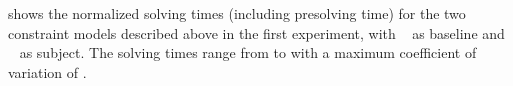  shows the
normalized solving times (including presolving time) for the two
\glspl{constraint model} described above in the first experiment, with
~\modelA{} as \gls{baseline} and ~\modelB{} as \gls{subject}.
%
The solving times range from
\printMinSolvingTime{
  \SolvTechDisableDomMatchesPrePlusSolvingTimeSpeedupAllPrePlusSolvingTimeAvgMin,
  \SolvTechDisableDomMatchesPrePlusSolvingTimeSpeedupPrePlusSolvingTimeAvgMin,
  \SolvTechDisableIllegalMatchesUncoveredOpsPrePlusSolvingTimeSpeedupPrePlusSolvingTimeAvgMin,
  \SolvTechDisableIllegalMatchesUndefinedDataPrePlusSolvingTimeSpeedupPrePlusSolvingTimeAvgMin,
  \SolvTechDisableIllegalMatchesKillsPrePlusSolvingTimeSpeedupPrePlusSolvingTimeAvgMin,
  \SolvTechDisableIllegalMatchesDefLocsPrePlusSolvingTimeSpeedupPrePlusSolvingTimeAvgMin,
  \SolvTechDisableIllegalMatchesUseLocsPrePlusSolvingTimeSpeedupPrePlusSolvingTimeAvgMin,
  \SolvTechDisableRedunKillsPrePlusSolvingTimeSpeedupPrePlusSolvingTimeAvgMin,
  \SolvTechDisableRedunNonNullCopyMatchesPrePlusSolvingTimeSpeedupPrePlusSolvingTimeAvgMin,
  \SolvTechDisableCanonicalLocsPrePlusSolvingTimeSpeedupPrePlusSolvingTimeAvgMin
} to
\printMaxSolvingTime{
  \SolvTechDisableDomMatchesPrePlusSolvingTimeSpeedupAllPrePlusSolvingTimeAvgMax,
  \SolvTechDisableDomMatchesPrePlusSolvingTimeSpeedupPrePlusSolvingTimeAvgMax,
  \SolvTechDisableIllegalMatchesUncoveredOpsPrePlusSolvingTimeSpeedupPrePlusSolvingTimeAvgMax,
  \SolvTechDisableIllegalMatchesUndefinedDataPrePlusSolvingTimeSpeedupPrePlusSolvingTimeAvgMax,
  \SolvTechDisableIllegalMatchesKillsPrePlusSolvingTimeSpeedupPrePlusSolvingTimeAvgMax,
  \SolvTechDisableIllegalMatchesDefLocsPrePlusSolvingTimeSpeedupPrePlusSolvingTimeAvgMax,
  \SolvTechDisableIllegalMatchesUseLocsPrePlusSolvingTimeSpeedupPrePlusSolvingTimeAvgMax,
  \SolvTechDisableRedunKillsPrePlusSolvingTimeSpeedupPrePlusSolvingTimeAvgMax,
  \SolvTechDisableRedunNonNullCopyMatchesPrePlusSolvingTimeSpeedupPrePlusSolvingTimeAvgMax,
  \SolvTechDisableCanonicalLocsPrePlusSolvingTimeSpeedupPrePlusSolvingTimeAvgMax
} with a maximum coefficient of variation of
\numMaxOf{
  \SolvTechDisableDomMatchesPrePlusSolvingTimeSpeedupAllPrePlusSolvingTimeCvMax,
  \SolvTechDisableDomMatchesPrePlusSolvingTimeSpeedupPrePlusSolvingTimeCvMax,
  \SolvTechDisableIllegalMatchesUncoveredOpsPrePlusSolvingTimeSpeedupPrePlusSolvingTimeCvMax,
  \SolvTechDisableIllegalMatchesUndefinedDataPrePlusSolvingTimeSpeedupPrePlusSolvingTimeCvMax,
  \SolvTechDisableIllegalMatchesKillsPrePlusSolvingTimeSpeedupPrePlusSolvingTimeCvMax,
  \SolvTechDisableIllegalMatchesDefLocsPrePlusSolvingTimeSpeedupPrePlusSolvingTimeCvMax,
  \SolvTechDisableIllegalMatchesUseLocsPrePlusSolvingTimeSpeedupPrePlusSolvingTimeCvMax,
  \SolvTechDisableRedunKillsPrePlusSolvingTimeSpeedupPrePlusSolvingTimeCvMax,
  \SolvTechDisableRedunNonNullCopyMatchesPrePlusSolvingTimeSpeedupPrePlusSolvingTimeCvMax,
  \SolvTechDisableCanonicalLocsPrePlusSolvingTimeSpeedupPrePlusSolvingTimeCvMax
}.
